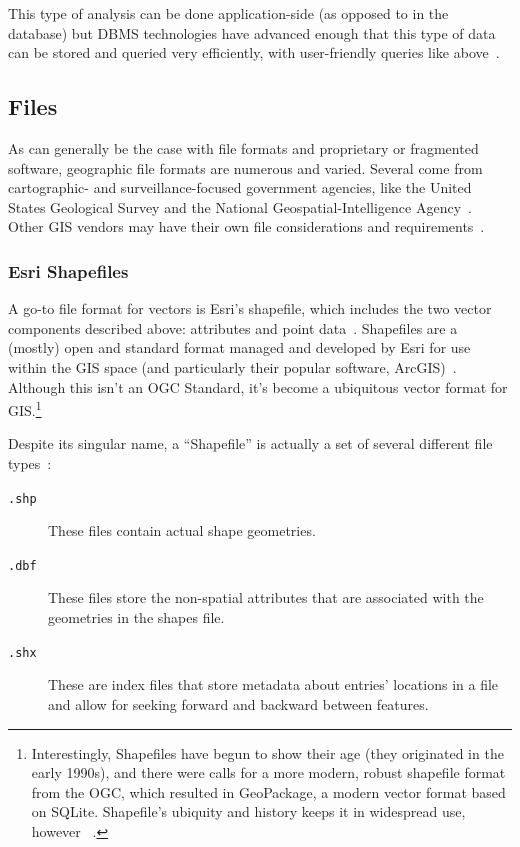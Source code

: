 This type of analysis can be done application-side (as opposed to in the database) but DBMS technologies have advanced enough that this type of data can be stored and queried very efficiently, with user-friendly queries like above~\cite{Boundless}.

\subsection{Files}
\label{background_formats}
As can generally be the case with file formats and proprietary or fragmented software, geographic file formats are numerous and varied. Several come from cartographic- and surveillance-focused government agencies, like the United States Geological Survey and the National Geospatial-Intelligence Agency~\cite{UsgsStandards}. Other GIS vendors may have their own file considerations and requirements~\cite{slashgeo,Environ1998,GeoJSON}.

\subsubsection{Esri Shapefiles}
A go-to file format for vectors is Esri's shapefile, which includes the two vector components described above: attributes and point data~\cite{Environ1998}. Shapefiles are a (mostly) open and standard format managed and developed by Esri for use within the GIS space (and particularly their popular software, ArcGIS)~\cite{Environ1998}. Although this isn't an OGC Standard, it's become a ubiquitous vector format for GIS.\footnote{Interestingly, Shapefiles have begun to show their age (they originated in the early 1990s), and there were calls for a more modern, robust shapefile format from the OGC, which resulted in GeoPackage, a modern vector format based on SQLite. Shapefile's ubiquity and history keeps it in widespread use, however ~\cite{slashgeo,GeoPackage}.}

Despite its singular name, a ``Shapefile'' is actually a set of several different file types~\cite{Environ1998}:

\begin{description}
  \item[\tt{.shp}] These files contain actual shape geometries.
  \item[\tt{.dbf}] These files store the non-spatial attributes that are associated with the geometries in the shapes file.
  \item[\tt{.shx}] These are index files that store metadata about entries' locations in a file and allow for seeking forward and backward between features.
\end{description}

